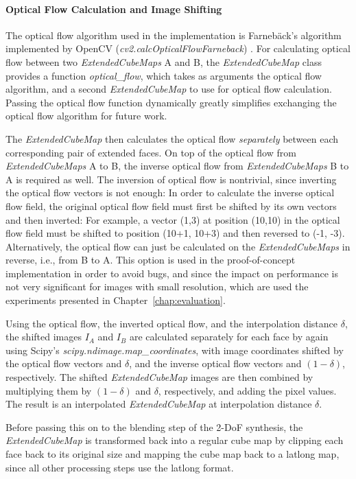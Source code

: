 \paragraph{Optical Flow Calculation and Image Shifting}
The optical flow algorithm used in the implementation is Farneb\"ack's algorithm implemented by OpenCV (\emph{cv2.calcOpticalFlowFarneback}) \cite{opencv}. For calculating optical flow between two \emph{ExtendedCubeMaps} A and B, the \emph{ExtendedCubeMap} class provides a function \emph{optical\_flow}, which takes as arguments the optical flow algorithm, and a second \emph{ExtendedCubeMap} to use for optical flow calculation. Passing the optical flow function dynamically greatly simplifies exchanging the optical flow algorithm for future work.

The \emph{ExtendedCubeMap} then calculates the optical flow \emph{separately} between each corresponding pair of extended faces. On top of the optical flow from \emph{ExtendedCubeMaps} A to B, the inverse optical flow from \emph{ExtendedCubeMaps} B to A is required as well. The inversion of optical flow is nontrivial, since inverting the optical flow vectors is not enough: In order to calculate the inverse optical flow field, the original optical flow field must first be shifted by its own vectors and then inverted: For example, a vector (1,3) at position (10,10) in the optical flow field must be shifted to position (10+1, 10+3) and then reversed to (-1, -3). Alternatively, the optical flow can just be calculated on the \emph{ExtendedCubeMaps} in reverse, i.e., from B to A. This option is used in the proof-of-concept implementation in order to avoid bugs, and since the impact on performance is not very significant for images with small resolution, which are used the experiments presented in Chapter~\ref{chap:evaluation}.

Using the optical flow, the inverted optical flow, and the interpolation distance $\delta$, the shifted images $I_A$ and $I_B$ are calculated separately for each face by again using Scipy's \emph{scipy.ndimage.map\_coordinates}, with image coordinates shifted by the optical flow vectors and $\delta$, and the inverse optical flow vectors and $(1-\delta)$, respectively. The shifted \emph{ExtendedCubeMap} images are then combined by multiplying them by $(1-\delta)$ and $\delta$, respectively, and adding the pixel values. The result is an interpolated \emph{ExtendedCubeMap} at interpolation distance $\delta$.

Before passing this on to the blending step of the 2-DoF synthesis, the \emph{ExtendedCubeMap} is transformed back into a regular cube map by clipping each face back to its original size and mapping the cube map back to a latlong map, since all other processing steps use the latlong format.

